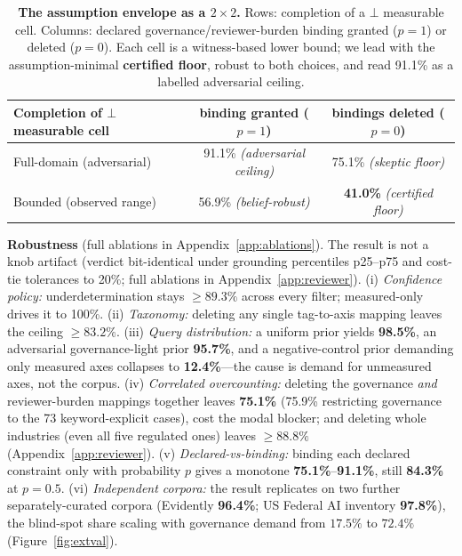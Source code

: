 \documentclass{article} %
\newcommand{\bbot}{\bot}
\begin{document}
\begin{table}[t]
\centering
\footnotesize
\caption{\textbf{The assumption envelope as a $2\times2$.} Rows: completion of a $\bbot$ measurable cell. Columns: declared governance/reviewer-burden binding granted ($p{=}1$) or deleted ($p{=}0$). Each cell is a witness-based lower bound; we lead with the assumption-minimal \textbf{certified floor}, robust to both choices, and read 91.1\% as a labelled adversarial ceiling.}
\label{tab:twobytwo}
\begin{tabular}{lcc}
\toprule
Completion of $\bbot$ measurable cell & binding granted ($p{=}1$) & bindings deleted ($p{=}0$) \\
\midrule
Full-domain (adversarial) & 91.1\% \emph{(adversarial ceiling)} & 75.1\% \emph{(skeptic floor)} \\
Bounded (observed range) & 56.9\% \emph{(belief-robust)} & \textbf{41.0\%} \emph{(certified floor)} \\
\bottomrule
\end{tabular}
\end{table}

 \textbf{Robustness} (full ablations in Appendix~\ref{app:ablations}).
The result is not a knob artifact (verdict bit-identical under grounding percentiles p25--p75 and cost-tie tolerances to 20\%; full ablations in Appendix~\ref{app:reviewer}). (i) \emph{Confidence policy:} underdetermination stays $\ge 89.3\%$ across every filter; measured-only drives it to 100\%. (ii) \emph{Taxonomy:} deleting any single tag-to-axis mapping leaves the ceiling $\ge 83.2\%$. (iii) \emph{Query distribution:} a uniform prior yields \textbf{98.5\%}, an adversarial governance-light prior \textbf{95.7\%}, and a negative-control prior demanding only measured axes collapses to \textbf{12.4\%}---the cause is demand for unmeasured axes, not the corpus. (iv) \emph{Correlated overcounting:} deleting the governance \emph{and} reviewer-burden mappings together leaves \textbf{75.1\%} (75.9\% restricting governance to the 73 keyword-explicit cases), cost the modal blocker; and deleting whole industries (even all five regulated ones) leaves $\ge 88.8\%$ (Appendix~\ref{app:reviewer}). (v) \emph{Declared-vs-binding:} binding each declared constraint only with probability $p$ gives a monotone \textbf{75.1\%}--\textbf{91.1\%}, still \textbf{84.3\%} at $p{=}0.5$. (vi) \emph{Independent corpora:} the result replicates on two further separately-curated corpora (Evidently \textbf{96.4\%}; US Federal AI inventory \textbf{97.8\%}), the blind-spot share scaling with governance demand from $17.5\%$ to $72.4\%$ (Figure~\ref{fig:extval}).
\end{document}
